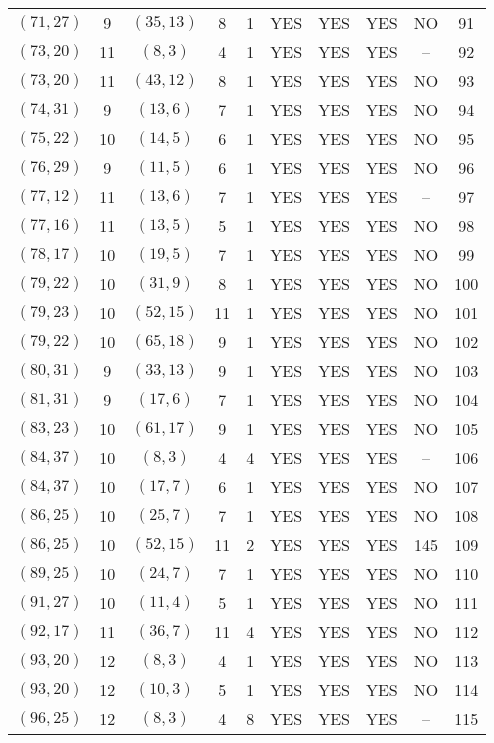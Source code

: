 \begin{longtable}{|c|c|c|c|c|c|c|c|c|c|}
$(71, 27)$ & 9 & $(35, 13)$ & 8 & 1 & YES & YES & YES & NO & 91\\
$(73, 20)$ & 11 & $(8, 3)$ & 4 & 1 & YES & YES & YES & -- & 92\\
$(73, 20)$ & 11 & $(43, 12)$ & 8 & 1 & YES & YES & YES & NO & 93\\
$(74, 31)$ & 9 & $(13, 6)$ & 7 & 1 & YES & YES & YES & NO & 94\\
$(75, 22)$ & 10 & $(14, 5)$ & 6 & 1 & YES & YES & YES & NO & 95\\
$(76, 29)$ & 9 & $(11, 5)$ & 6 & 1 & YES & YES & YES & NO & 96\\
$(77, 12)$ & 11 & $(13, 6)$ & 7 & 1 & YES & YES & YES & -- & 97\\
$(77, 16)$ & 11 & $(13, 5)$ & 5 & 1 & YES & YES & YES & NO & 98\\
$(78, 17)$ & 10 & $(19, 5)$ & 7 & 1 & YES & YES & YES & NO & 99\\
$(79, 22)$ & 10 & $(31, 9)$ & 8 & 1 & YES & YES & YES & NO & 100\\
$(79, 23)$ & 10 & $(52, 15)$ & 11 & 1 & YES & YES & YES & NO & 101\\
$(79, 22)$ & 10 & $(65, 18)$ & 9 & 1 & YES & YES & YES & NO & 102\\
$(80, 31)$ & 9 & $(33, 13)$ & 9 & 1 & YES & YES & YES & NO & 103\\
$(81, 31)$ & 9 & $(17, 6)$ & 7 & 1 & YES & YES & YES & NO & 104\\
$(83, 23)$ & 10 & $(61, 17)$ & 9 & 1 & YES & YES & YES & NO & 105\\
$(84, 37)$ & 10 & $(8, 3)$ & 4 & 4 & YES & YES & YES & -- & 106\\
$(84, 37)$ & 10 & $(17, 7)$ & 6 & 1 & YES & YES & YES & NO & 107\\
$(86, 25)$ & 10 & $(25, 7)$ & 7 & 1 & YES & YES & YES & NO & 108\\
$(86, 25)$ & 10 & $(52, 15)$ & 11 & 2 & YES & YES & YES & 145 & 109\\
$(89, 25)$ & 10 & $(24, 7)$ & 7 & 1 & YES & YES & YES & NO & 110\\
$(91, 27)$ & 10 & $(11, 4)$ & 5 & 1 & YES & YES & YES & NO & 111\\
$(92, 17)$ & 11 & $(36, 7)$ & 11 & 4 & YES & YES & YES & NO & 112\\
$(93, 20)$ & 12 & $(8, 3)$ & 4 & 1 & YES & YES & YES & NO & 113\\
$(93, 20)$ & 12 & $(10, 3)$ & 5 & 1 & YES & YES & YES & NO & 114\\
$(96, 25)$ & 12 & $(8, 3)$ & 4 & 8 & YES & YES & YES & -- & 115\\

\end{longtable}
